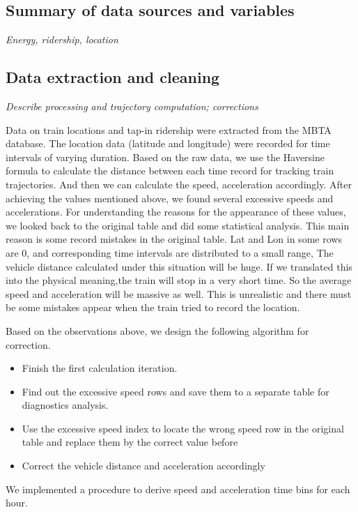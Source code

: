 \documentclass[preprint, 11pt]{elsarticle}
\newcommand{\?}{\stackrel{?}{=}}
\begin{document}
\subsection{Summary of data sources and variables}
{\it Energy, ridership, location}

\subsection{Data extraction and cleaning}
{\it Describe processing and trajectory computation; corrections}

Data on train locations and tap-in ridership were extracted from the MBTA database.
The location data (latitude and longitude) were recorded for time intervals of varying duration. Based on the raw data, we use the Haversine formula to calculate the distance between each time record for tracking train trajectories. And then we can calculate the speed, acceleration accordingly. 
After achieving the values mentioned above, we found several excessive speeds and accelerations. For understanding the reasons for the appearance of these values, we looked back to the original table and did some statistical analysis. 
This main reason is  some record mistakes in the original table. Lat and Lon in some rows are 0, and corresponding time intervals are distributed to a small range, The vehicle distance calculated under this situation will be huge. If we translated this into the physical meaning,the train will stop in a very short time. So the average speed and acceleration will be massive as well. This is unrealistic and there must be some mistakes appear when the train tried to record the location.

Based on the observations above, we design the following algorithm for correction.
\begin{itemize}
\item Finish the first calculation iteration.
\item Find out the excessive speed rows and save them to a separate table for diagnostics analysis.
\item Use the excessive speed index to locate the wrong speed row in the original table and replace them by the correct value before
\item Correct the vehicle distance and acceleration accordingly
\end{itemize}


We implemented a procedure to derive speed and acceleration time bins for each hour. 
\end{document}
